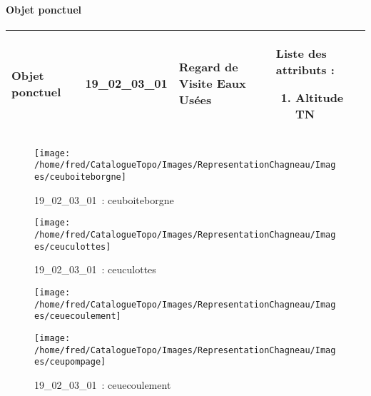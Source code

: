 \documentclass[12pt,titlepage]{book}
\begin{document}
\paragraph{Objet ponctuel}
\noindent
\vspace{\baselineskip}

\renewcommand{\arraystretch}{1.2}
\begin{supertabular}{|p{10cm}|c|p{13cm}|p{12cm}|}
 Objet ponctuel & 19\_02\_03\_01 & Regard de Visite Eaux Usées & Liste des attributs :
\begin{enumerate}
  \item Altitude TN\end{enumerate}
\\
\hline
\end{supertabular}
\begin{figure}[h!]
  \hfill         %
  \begin{minipage}[t]{3cm}
    \begin{center}
      \texttt{[image: /home/fred/CatalogueTopo/Images/RepresentationChagneau/Images/ceuboiteborgne]}
      \caption[~19\_02\_03\_01]{\small{19\_02\_03\_01~:} \tiny{ceuboiteborgne}}\label{ceuboiteborgne}
    \end{center}
  \end{minipage}
  \begin{minipage}[t]{3cm}
    \begin{center}
      \texttt{[image: /home/fred/CatalogueTopo/Images/RepresentationChagneau/Images/ceuculottes]}
      \caption[~19\_02\_03\_01]{\small{19\_02\_03\_01~:} \tiny{ceuculottes}}\label{ceuculottes}
    \end{center}
  \end{minipage}
  \begin{minipage}[t]{3cm}
    \begin{center}
      \texttt{[image: /home/fred/CatalogueTopo/Images/RepresentationChagneau/Images/ceuecoulement]}
      \caption[~19\_02\_03\_01]{\small{19\_02\_03\_01~:} \tiny{ceuecoulement}}\label{ceuecoulement}
    \end{center}
  \end{minipage}
  \begin{minipage}[t]{3cm}
    \begin{center}
      \texttt{[image: /home/fred/CatalogueTopo/Images/RepresentationChagneau/Images/ceupompage]}

\end{center}
\end{minipage}
\end{figure}
\end{document}
